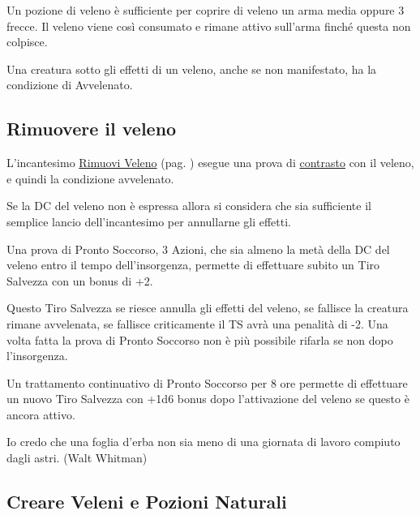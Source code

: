 \begin{multicols}{2}
Un pozione di veleno è sufficiente per coprire di veleno un arma media oppure 3 frecce. Il veleno viene così consumato e rimane attivo sull'arma finché questa non colpisce.

Una creatura sotto gli effetti di un veleno, anche se non manifestato, ha la condizione di Avvelenato.

\subsection{Rimuovere il veleno}

L'incantesimo \hyperlink{incrimuoviveleno}{Rimuovi Veleno} (pag. \pageref{incrimuoviveleno}) esegue una prova di \hyperlink{contrastareincantesimi}{contrasto} con il veleno, e quindi la condizione avvelenato.

Se la DC del veleno non è espressa allora si considera che sia sufficiente il semplice lancio dell'incantesimo per annullarne gli effetti.

Una prova di Pronto Soccorso, 3 Azioni, che sia almeno la metà della DC del veleno entro il tempo dell'insorgenza, permette di effettuare subito un Tiro Salvezza con un bonus di +2.

Questo Tiro Salvezza se riesce annulla gli effetti del veleno, se fallisce la creatura rimane avvelenata, se fallisce criticamente il TS avrà una penalità di -2. 
Una volta fatta la prova di Pronto Soccorso non è più possibile rifarla se non dopo l'insorgenza.

Un trattamento continuativo di Pronto Soccorso per 8 ore permette di effettuare un nuovo Tiro Salvezza con +1d6 bonus dopo l'attivazione del veleno se questo è ancora attivo.

\medskip

\begin{changemargin}{0.3cm}{0.3cm}\begin{enfasi}{
Io credo che una foglia d'erba non sia meno di una giornata di lavoro compiuto dagli astri. (Walt Whitman)}
\end{enfasi}\end{changemargin}

\subsection{Creare Veleni e Pozioni Naturali}\label{crearevelenonaturale}


\end{multicols}
